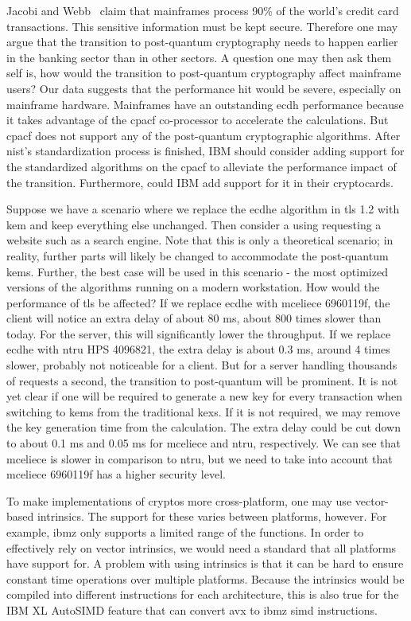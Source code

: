 Jacobi and Webb~\cite{jacobi2020} claim that mainframes process 90\% of the world's credit card transactions. This sensitive information must be kept secure. Therefore one may argue that the transition to post-quantum cryptography needs to happen earlier in the banking sector than in other sectors. A question one may then ask them self is, how would the transition to post-quantum cryptography affect mainframe users? Our data suggests that the performance hit would be severe, especially on mainframe hardware. Mainframes have an outstanding \gls{ecdh} performance because it takes advantage of the \gls{cpacf} co-processor to accelerate the calculations. But \gls{cpacf} does not support any of the post-quantum cryptographic algorithms. After \gls{nist}'s standardization process is finished, IBM should consider adding support for the standardized algorithms on the \gls{cpacf} to alleviate the performance impact of the transition. Furthermore, could IBM add support for it in their cryptocards.

Suppose we have a scenario where we replace the \gls{ecdhe} algorithm in \gls{tls} 1.2 with \gls{kem} and keep everything else unchanged. Then consider a using requesting a website such as a search engine. Note that this is only a theoretical scenario; in reality, further parts will likely be changed to accommodate the \gls{post-quantum} \glspl{kem}. Further, the best case will be used in this scenario - the most optimized versions of the algorithms running on a modern workstation. How would the performance of \gls{tls} be affected? If we replace \gls{ecdhe} with \gls{mceliece} 6960119f, the client will notice an extra delay of about 80 ms, about 800 times slower than today. For the server, this will significantly lower the throughput. If we replace \gls{ecdhe} with \gls{ntru} HPS 4096821, the extra delay is about 0.3 ms, around 4 times slower, probably not noticeable for a client. But for a server handling thousands of requests a second, the transition to post-quantum will be prominent. It is not yet clear if one will be required to generate a new key for every transaction when switching to \glspl{kem} from the traditional \glspl{kex}. If it is not required, we may remove the key generation time from the calculation. The extra delay could be cut down to about 0.1 ms and 0.05 ms for \gls{mceliece} and \gls{ntru}, respectively. We can see that \gls{mceliece} is slower in comparison to \gls{ntru}, but we need to take into account that \gls{mceliece} 6960119f has a higher security level.

To make implementations of cryptos more cross-platform, one may use vector-based intrinsics. The support for these varies between platforms, however. For example, \gls{ibmz} only supports a limited range of the functions. In order to effectively rely on vector intrinsics, we would need a standard that all platforms have support for. A problem with using intrinsics is that it can be hard to ensure constant time operations over multiple platforms. Because the intrinsics would be compiled into different instructions for each architecture, this is also true for the IBM XL AutoSIMD feature that can convert \gls{avx} to \gls{ibmz} \gls{simd} instructions.


